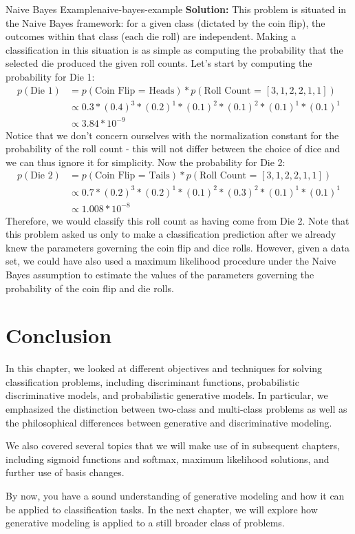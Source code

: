 \begin{example}{Naive Bayes Example}{naive-bayes-example}
	\textbf{Solution:} \newline
	This problem is situated in the Naive Bayes framework: for a given class (dictated by the coin flip), the outcomes within that class (each die roll) are independent. Making a classification in this situation is as simple as computing the probability that the selected die produced the given roll counts. Let's start by computing the probability for Die 1:
	\begin{align*}
		p(\text{Die 1}) &= p(\text{Coin Flip = Heads}) * p(\text{Roll Count = }[3,1,2,2,1,1]) \\
		&\propto 0.3 * (0.4)^{3} * (0.2)^{1} * (0.1)^{2} * (0.1)^{2} * (0.1)^{1} * (0.1)^{1} \\
		&\propto 3.84 * 10^{-9}
	\end{align*}
	Notice that we don't concern ourselves with the normalization constant for the probability of the roll count - this will not differ between the choice of dice and we can thus ignore it for simplicity. Now the probability for Die 2:
	\begin{align*}
		p(\text{Die 2}) &= p(\text{Coin Flip = Tails}) * p(\text{Roll Count = }[3,1,2,2,1,1]) \\
		&\propto 0.7 * (0.2)^{3} * (0.2)^{1} * (0.1)^{2} * (0.3)^{2} * (0.1)^{1} * (0.1)^{1} \\
		&\propto 1.008 * 10^{-8}
	\end{align*}
	Therefore, we would classify this roll count as having come from Die 2. \newline \newline
	Note that this problem asked us only to make a classification prediction after we already knew the parameters governing the coin flip and dice rolls. However, given a data set, we could have also used a maximum likelihood procedure under the Naive Bayes assumption to estimate the values of the parameters governing the probability of the coin flip and die rolls.
\end{example}

\section{Conclusion}
In this chapter, we looked at different objectives and techniques for solving classification problems, including discriminant functions, probabilistic discriminative models, and probabilistic generative models. In particular, we emphasized the distinction between two-class and multi-class problems as well as the philosophical differences between generative and discriminative modeling.

We also covered several topics that we will make use of in subsequent chapters, including sigmoid functions and softmax, maximum likelihood solutions, and further use of basis changes.

By now, you have a sound understanding of generative modeling and how it can be applied to classification tasks. In the next chapter, we will explore how generative modeling is applied to a still broader class of problems.
